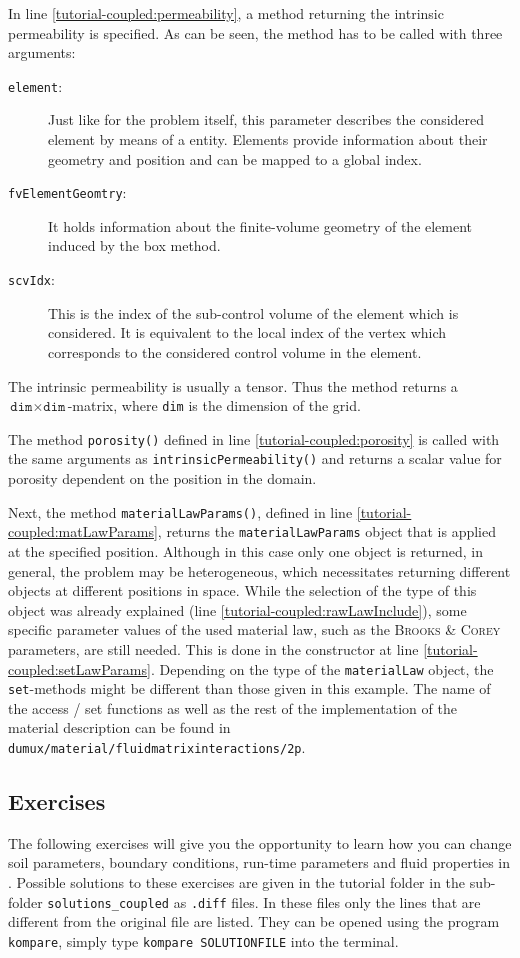 In line \ref{tutorial-coupled:permeability}, a method returning the
intrinsic permeability is specified. As can be seen, the method has
to be called with three arguments:
\begin{description}
\item[\texttt{element}:] Just like for the problem itself, this
  parameter describes the considered element by means of a \Dune
  entity. Elements provide information about their geometry and
  position and can be mapped to a global index.
\item[\texttt{fvElementGeomtry}:] It holds information about the finite-volume
  geometry of the element induced by the box method.
\item[\texttt{scvIdx}:] This is the index of the sub-control volume of the
  element which is considered. It is equivalent to the local index
  of the vertex which corresponds to the considered control volume in
  the element.
\end{description}

The intrinsic permeability is usually a tensor. Thus the method returns
a $\texttt{dim} \times \texttt{dim}$-matrix, where \texttt{dim} is the
dimension of the grid.

The method \texttt{porosity()} defined in line
\ref{tutorial-coupled:porosity} is called with the same arguments as
\texttt{intrinsicPermeability()} and returns a scalar value for
porosity dependent on the position in the domain.

Next, the method \texttt{materialLawParams()}, defined in line
\ref{tutorial-coupled:matLawParams}, returns the
\verb+materialLawParams+ object that is applied at the specified
position. Although in this case only one object is returned, in
general, the problem may be heterogeneous, which necessitates
returning different objects at different positions in space.  While
the selection of the type of this object was already explained (line
\ref{tutorial-coupled:rawLawInclude}), some specific parameter values
of the used material law, such as the \textsc{Brooks} \&
\textsc{Corey} parameters, are still needed. This is done in the
constructor at line \ref{tutorial-coupled:setLawParams}.  Depending on
the type of the \texttt{materialLaw} object, the \texttt{set}-methods
might be different than those given in this example. The name of the
access / set functions as well as the rest of the implementation of
the material description can be found in
\verb+dumux/material/fluidmatrixinteractions/2p+.

\subsection{Exercises}
\label{tutorial-coupled:exercises}
The following exercises will give you the opportunity to learn how you
can change soil parameters, boundary conditions, run-time parameters
and fluid properties in \Dumux. Possible solutions to these exercises are given in the tutorial folder in the
sub-folder \texttt{solutions\_coupled} as \texttt{.diff} files. In these files only the lines that are different from the original file are listed. 
They can be opened using the program \texttt{kompare}, simply type \texttt{kompare SOLUTIONFILE} into the terminal.


